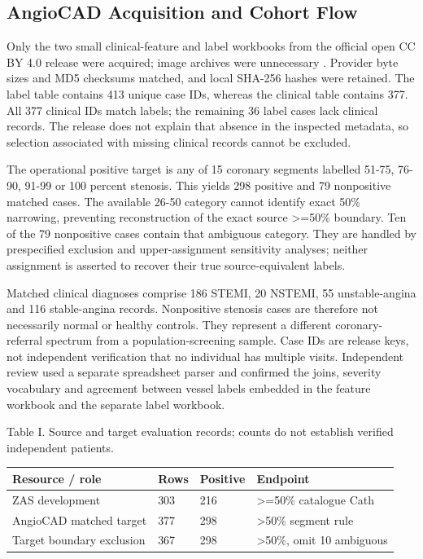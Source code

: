 \documentclass[conference]{IEEEtran}
\begin{document}
\subsection{AngioCAD Acquisition and Cohort Flow}
Only the two small clinical-feature and label workbooks from the official open CC BY 4.0 release were acquired; image archives were unnecessary \cite{r4}. Provider byte sizes and MD5 checksums matched, and local SHA-256 hashes were retained. The label table contains 413 unique case IDs, whereas the clinical table contains 377. All 377 clinical IDs match labels; the remaining 36 label cases lack clinical records. The release does not explain that absence in the inspected metadata, so selection associated with missing clinical records cannot be excluded.

The operational positive target is any of 15 coronary segments labelled 51-75, 76-90, 91-99 or 100 percent stenosis. This yields 298 positive and 79 nonpositive matched cases. The available 26-50 category cannot identify exact 50\% narrowing, preventing reconstruction of the exact source >=50\% boundary. Ten of the 79 nonpositive cases contain that ambiguous category. They are handled by prespecified exclusion and upper-assignment sensitivity analyses; neither assignment is asserted to recover their true source-equivalent labels.

Matched clinical diagnoses comprise 186 STEMI, 20 NSTEMI, 55 unstable-angina and 116 stable-angina records. Nonpositive stenosis cases are therefore not necessarily normal or healthy controls. They represent a different coronary-referral spectrum from a population-screening sample. Case IDs are release keys, not independent verification that no individual has multiple visits. Independent review used a separate spreadsheet parser and confirmed the joins, severity vocabulary and agreement between vessel labels embedded in the feature workbook and the separate label workbook.

\begin{center}\begin{minipage}{\columnwidth}\centering\footnotesize
Table I. Source and target evaluation records; counts do not establish verified independent patients.\par\vspace{3pt}
\setlength{\tabcolsep}{2.5pt}
\begin{tabular}{p{}p{}p{}p{}}
\toprule
Resource / role & Rows & Positive & Endpoint \\
\midrule
ZAS development & 303 & 216 & >=50\% catalogue Cath \\
AngioCAD matched target & 377 & 298 & >50\% segment rule \\
Target boundary exclusion & 367 & 298 & >50\%, omit 10 ambiguous \\
\bottomrule
\end{tabular}
\end{minipage}\end{center}
\end{document}

